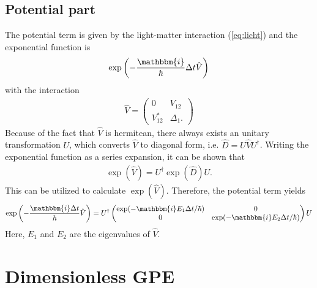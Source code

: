 \documentclass[12pt]{article}
\newcommand{\ic}{\mathbbm{i}}
\begin{document}
\subsection{Potential part}
The potential term is given by the light-matter interaction 
(\ref{eq:licht}) and the exponential function is 
\begin{align}
  \exp\left(-\frac{\ic}{\hbar}\Delta t \hat{V}\right) 
\end{align}
with the interaction    
\begin{eqnarray}
  \hat{V} = \begin{pmatrix}
  0 & V_{12} \\
V_{12}^* & \Delta_1.
\end{pmatrix}
\end{eqnarray} 
Because of the fact that $\hat{V}$ is hermitean, there always exists an unitary transformation $U$,
which converts $\hat{V}$ to diagonal form, i.e. $\hat{D}=U\hat{V}U^{\dagger}$. 
Writing the exponential function as a series expansion, 
it can be shown that
\begin{align}
  \exp\left(\hat{V}\right) = U^\dagger\exp\left(\hat{D}\right)U.
\end{align}
This can be utilized to calculate $\exp(\hat V)$. Therefore, the potential term yields
\begin{eqnarray}
\exp\left(-\frac{\ic\Delta t}{\hbar} \hat{V}\right) = U^\dagger 
\begin{pmatrix}
\exp(-\ic E_1\Delta t/\hbar) &  0\\ 0& \exp(-\ic E_2\Delta t/\hbar) 
\end{pmatrix} U \label{eq:num}
\end{eqnarray}
Here, $E_1$ and $E_2$ are the eigenvalues of $\hat{V}$.

\section{Dimensionless GPE}
\end{document}
